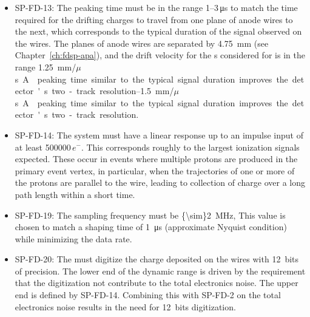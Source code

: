 \begin{itemize}
\item SP-FD-13: The  peaking time must be in the range \numrange{1}{3}\,\si{\micro\second} 
to match the time required for the drifting charges to travel from one plane of anode
wires to the next, which corresponds to the typical duration of the signal observed
on the wires. The planes of anode wires are separated by \SI{4.75}{mm} 
(see Chapter~\ref{ch:fdsp-apa}), and the drift velocity for
the \efield{}s considered for  is in the range
\SIrange{1.25}{1.5}{mm/$\mu$s}. %
A  peaking time  similar to the typical signal duration improves the detector's two-track resolution.  

\item SP-FD-14: The system must have a linear response up to an impulse input of 
at least \num{500000}\,$e^{-}$.  This corresponds roughly to the largest 
ionization signals expected. 
These occur in events where multiple protons are produced 
in the primary event vertex, in particular, when the trajectories of one 
or more of %
the protons are parallel to the wire, %
leading to collection of charge over a long path length within a short time.

\item SP-FD-19:  The  sampling frequency must be \SI{{\sim}2}{MHz},
This value is chosen to match a  shaping time of \SI{1}{\micro\second} 
(approximate Nyquist condition) while minimizing the data rate.

\item SP-FD-20:  The  must digitize the charge deposited on the wires 
with 12~bits of precision.  The lower end of the  dynamic 
range is driven by the requirement that the digitization %
not 
contribute to the total electronics noise. The upper end %
is defined by SP-FD-14. %
Combining this %
with SP-FD-2 %
on the total electronics noise 
results in the need for 12~bits digitization. 


\end{itemize}
